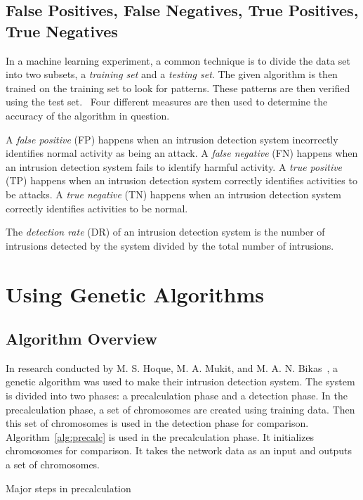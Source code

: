\documentclass{sig-alternate}
\begin{document}
\subsection{False Positives, False Negatives, True Positives, True Negatives}
\label{sec:PosNeg}
In a machine learning experiment, a common technique is to divide the data set into two subsets, a \emph{training set} and a \emph{testing set}. The given algorithm is then trained on the training set to look for patterns. These patterns are then verified using the test set.~\cite{bc1_ecindm} Four different measures are then used to determine the accuracy of the algorithm in question.

A \emph{false positive} (FP) happens when an intrusion detection system incorrectly identifies normal activity as being an attack. A \emph{false negative} (FN) happens when an intrusion detection system fails to identify harmful activity. A \emph{true positive} (TP) happens when an intrusion detection system correctly identifies activities to be attacks. A \emph{true negative} (TN) happens when an intrusion detection system correctly identifies activities to be normal.

The \emph{detection rate} (DR) of an intrusion detection system is the number of intrusions detected by the system divided by the total number of intrusions.~\cite{ids}




\section{Using Genetic Algorithms}
\label{sec:genAlgImp}

\subsection{Algorithm Overview}
In research conducted by M. S. Hoque, M. A. Mukit, and M. A. N. Bikas~\cite{DBLP:journals/corr/abs-1204-1336}, a genetic algorithm was used to make their intrusion detection system. The system is divided into two phases: a precalculation phase and a detection phase. In the precalculation phase, a set of chromosomes are created using training data. Then this set of chromosomes is used in the detection phase for comparison. Algorithm~\ref{alg:precalc} is used in the precalculation phase. It initializes chromosomes for comparison. It takes the network data as an input and outputs a set of chromosomes.

\begin{algorithm}
\caption{Major steps in precalculation}
\label{alg:precalc}
\begin{algorithmic}
  \ELSE {}
  \ENDIF
\ENDFOR
\end{algorithmic}
\end{algorithm}
\end{document}
